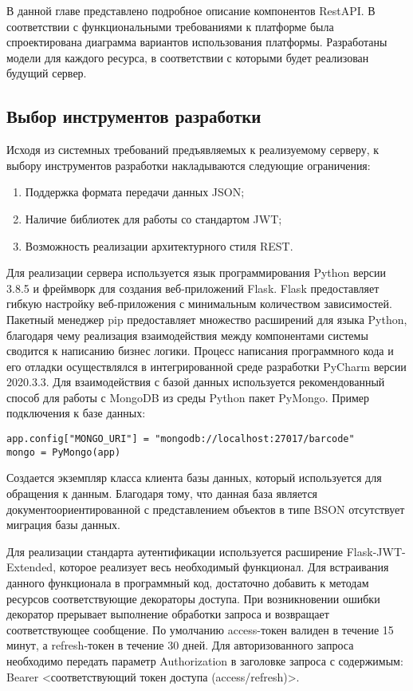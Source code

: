 В данной главе представлено подробное описание компонентов RestAPI. В соответствии с функциональными требованиями к платформе
была спроектирована диаграмма вариантов использования платформы.
Разработаны модели для каждого ресурса, в соответствии с которыми будет реализован будущий сервер.

\subsection{Выбор инструментов разработки}

Исходя из системных требований предъявляемых к реализуемому серверу, к выбору инструментов разработки накладываются следующие ограничения:
\begin{enumerate}
	\item Поддержка формата передачи данных JSON;
	\item Наличие библиотек для работы со стандартом JWT;
	\item Возможность реализации архитектурного стиля REST.
\end{enumerate}

Для реализации сервера используется язык программирования Python версии 3.8.5 и фреймворк для создания веб-приложений
Flask\cite{5}. Flask предоставляет гибкую настройку веб-приложения с минимальным количеством зависимостей. Пакетный менеджер pip предоставляет множество расширений для языка Python, благодаря чему реализация взаимодействия между компонентами системы сводится к написанию бизнес логики. Процесс написания программного кода и его отладки осуществлялся в интегрированной среде разработки PyCharm версии 2020.3.3. Для взаимодействия с базой данных используется рекомендованный способ для работы с MongoDB из среды Python пакет PyMongo\cite{6}. Пример подключения к базе данных:
\begin{lstlisting}
app.config["MONGO_URI"] = "mongodb://localhost:27017/barcode"
mongo = PyMongo(app)
\end{lstlisting}

Создается экземпляр класса клиента базы данных, который используется для обращения к данным. Благодаря тому, что данная база является документоориентированной с представлением объектов в типе BSON отсутствует миграция базы данных.

Для реализации стандарта аутентификации используется расширение
Flask-JWT-Extended\cite{7}, которое реализует весь необходимый функционал. Для встраивания данного функционала в программный код, достаточно добавить к методам ресурсов соответствующие декораторы доступа. При возникновении ошибки декоратор прерывает выполнение обработки запроса и возвращает соответствующее сообщение. По умолчанию access-токен валиден в течение 15 минут, а refresh-токен в течение 30 дней. Для авторизованного запроса необходимо передать параметр Authorization в заголовке запроса с содержимым: Bearer <соответствующий токен доступа (access/refresh)>.


